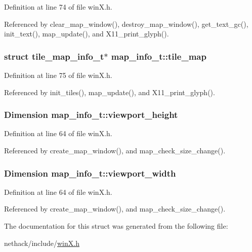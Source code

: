Definition at line 74 of file win\+X.\+h.



Referenced by clear\+\_\+map\+\_\+window(), destroy\+\_\+map\+\_\+window(), get\+\_\+text\+\_\+gc(), init\+\_\+text(), map\+\_\+update(), and X11\+\_\+print\+\_\+glyph().

\hypertarget{structmap__info__t_ad3a25f3b733498af77bc597a2d4edb17}{
\subsubsection[{tile\+\_\+map}]{\setlength{\rightskip}{0pt plus 5cm}struct {\bf tile\+\_\+map\+\_\+info\+\_\+t}$\ast$ map\+\_\+info\+\_\+t\+::tile\+\_\+map}}\label{structmap__info__t_ad3a25f3b733498af77bc597a2d4edb17}


Definition at line 75 of file win\+X.\+h.



Referenced by init\+\_\+tiles(), map\+\_\+update(), and X11\+\_\+print\+\_\+glyph().

\hypertarget{structmap__info__t_a0a0556414a1dfe75a986264538d66632}{
\subsubsection[{viewport\+\_\+height}]{\setlength{\rightskip}{0pt plus 5cm}Dimension map\+\_\+info\+\_\+t\+::viewport\+\_\+height}}\label{structmap__info__t_a0a0556414a1dfe75a986264538d66632}


Definition at line 64 of file win\+X.\+h.



Referenced by create\+\_\+map\+\_\+window(), and map\+\_\+check\+\_\+size\+\_\+change().

\hypertarget{structmap__info__t_a7bfa57571a4fbddbcb6514b23e1cf186}{
\subsubsection[{viewport\+\_\+width}]{\setlength{\rightskip}{0pt plus 5cm}Dimension map\+\_\+info\+\_\+t\+::viewport\+\_\+width}}\label{structmap__info__t_a7bfa57571a4fbddbcb6514b23e1cf186}


Definition at line 64 of file win\+X.\+h.



Referenced by create\+\_\+map\+\_\+window(), and map\+\_\+check\+\_\+size\+\_\+change().



The documentation for this struct was generated from the following file\+:\begin{DoxyCompactItemize}
\item 
nethack/include/\hyperlink{winX_8h}{win\+X.\+h}\end{DoxyCompactItemize}
